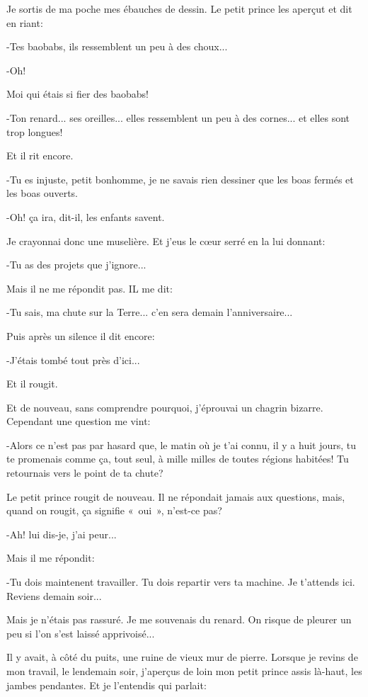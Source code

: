 \documentclass{report}
\begin{document}
Je sortis de ma poche mes ébauches de dessin. Le petit prince les aperçut et dit en riant:

-Tes baobabs, ils ressemblent un peu à des choux...

-Oh!

Moi qui étais si fier des baobabs!

-Ton renard... ses oreilles... elles ressemblent un peu à des cornes... et elles sont trop longues!

Et il rit encore.

-Tu es injuste, petit bonhomme, je ne savais rien dessiner que les boas fermés et les boas ouverts.

-Oh! ça ira, dit-il, les enfants savent.

Je crayonnai donc une muselière. Et j'eus le cœur serré en la lui donnant:

-Tu as des projets que j'ignore...

Mais il ne me répondit pas. IL me dit:

-Tu sais, ma chute sur la Terre... c'en sera demain l'anniversaire...

Puis après un silence il dit encore:

-J'étais tombé tout près d'ici...

Et il rougit.

Et de nouveau, sans comprendre pourquoi, j'éprouvai un chagrin bizarre. Cependant une question me vint:

-Alors ce n'est pas par hasard que, le matin où je t'ai connu, il y a huit jours, tu te promenais comme ça, tout seul, à mille milles de toutes régions habitées! Tu retournais vers le point de ta chute?

Le petit prince rougit de nouveau. Il ne répondait jamais aux questions, mais, quand on rougit, ça signifie «~oui~», n'est-ce pas?

-Ah! lui dis-je, j'ai peur...

Mais il me répondit:

-Tu dois maintenent travailler. Tu dois repartir vers ta machine. Je t'attends ici. Reviens demain soir...

Mais je n'étais pas rassuré. Je me souvenais du renard. On risque de pleurer un peu si l'on s'est laissé apprivoisé...

\parachapter{} %
Il y avait, à côté du puits, une ruine de vieux mur de pierre. Lorsque je revins de mon travail, le lendemain soir, j'aperçus de loin mon petit prince assis là-haut, les jambes pendantes. Et je l'entendis qui parlait:
\end{document}
